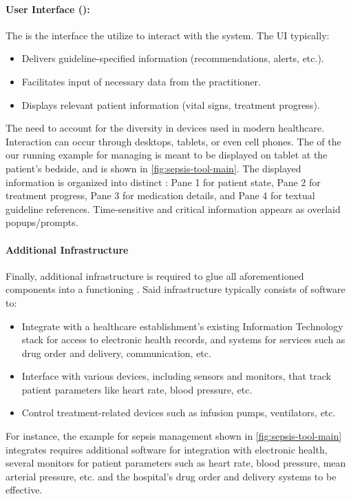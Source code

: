 \paragraph{User Interface (\UI{}):}

The \UI{} is the interface the \HCPs{} utilize to interact with the system.
The UI typically:
\begin{itemize}
  \item Delivers guideline-specified information (recommendations, alerts, etc.).
  \item Facilitates input of necessary data from the practitioner.
  \item Displays relevant patient information (vital signs, treatment progress).
\end{itemize}

The \UIs{} need to account for the diversity in devices used in modern
healthcare. Interaction can occur through desktops, tablets, or even cell
phones. The \UI{} of the our running example \CDSS{} for managing \CDSS{}
is meant to be displayed on tablet at the patient's bedside, and is shown in
\figurename{} \ref{fig:sepsis-tool-main}.
The displayed information is organized into distinct :
Pane 1 for patient state, Pane 2 for treatment progress,
Pane 3 for medication details, and Pane 4 for textual guideline references.
Time-sensitive and critical information appears as overlaid popups/prompts.

\paragraph{Additional Infrastructure}

Finally, additional infrastructure is required to glue all aforementioned
components into a functioning \CDSS{}. Said infrastructure typically consists
of software to:
\begin{itemize}
  \item Integrate with a healthcare establishment's existing Information Technology
    stack for access to electronic health records, and systems for services such
    as drug order and delivery, \HCP{} communication, etc.
  \item Interface with various devices, including sensors and monitors,
    that track patient parameters like heart rate, blood pressure, etc.
  \item Control treatment-related devices such as infusion pumps, ventilators, etc.
\end{itemize}
For instance, the example \CDSS{} for sepsis management shown in \figurename{}
\ref{fig:sepsis-tool-main} integrates requires additional software for integration with
electronic health, several monitors for patient parameters
such as heart rate, blood pressure, mean arterial pressure, etc. and the
hospital's drug order and delivery systems to be effective.
